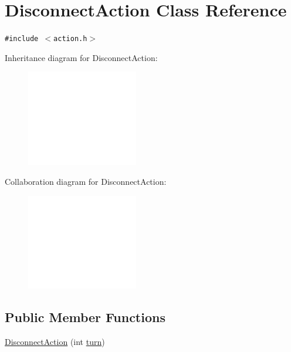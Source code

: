 \hypertarget{classDisconnectAction}{
\section{DisconnectAction Class Reference}
\label{classDisconnectAction}
}
{\tt \#include $<$action.h$>$}

Inheritance diagram for DisconnectAction:\nopagebreak
\begin{figure}[H]
\begin{center}
\leavevmode
\includegraphics[width=138pt]{classDisconnectAction__inherit__graph}
\end{center}
\end{figure}
Collaboration diagram for DisconnectAction:\nopagebreak
\begin{figure}[H]
\begin{center}
\leavevmode
\includegraphics[width=138pt]{classDisconnectAction__coll__graph}
\end{center}
\end{figure}
\subsection*{Public Member Functions}
\begin{CompactItemize}
\item 
\hyperlink{classDisconnectAction_7b9d0cdf0f6baac981a67952aa595014}{DisconnectAction} (int \hyperlink{classAction_51e5d56a6aa4a037e90df19587a225c7}{turn})
\end{CompactItemize}


